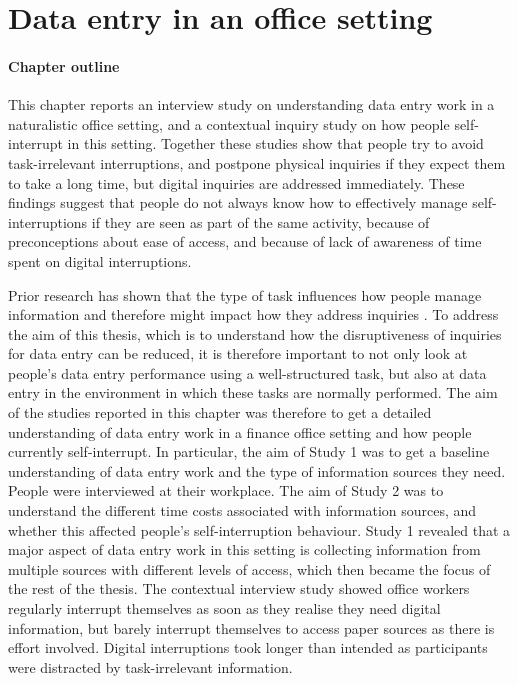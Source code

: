\chapter{Data entry in an office setting}\label{ch:Study1}
\begin{mynote}
\subsubsection{Chapter outline}

This chapter reports an interview study on understanding data entry work in a naturalistic office setting, and a contextual inquiry study on how people self-interrupt in this setting. Together these studies show that people try to avoid task-irrelevant interruptions, and postpone physical inquiries if they expect them to take a long time, but digital inquiries are addressed immediately. These findings suggest that people do not always know how to effectively manage self-interruptions if they are seen as part of the same activity, because of preconceptions about ease of access, and because of lack of awareness of time spent on digital interruptions.

\end{mynote}
Prior research has shown that the type of task influences how people manage information and therefore might impact how they address inquiries \citep{Bondarenko2005}. To address the aim of this thesis, which is to understand how the disruptiveness of inquiries for data entry can be reduced, it is therefore important to not only look at people's data entry performance using a well-structured task, but also at data entry in the environment in which these tasks are normally performed. The aim of the studies reported in this chapter was therefore to get a detailed understanding of data entry work in a finance office setting and how people currently self-interrupt. In particular, the aim of Study 1 was to get a baseline understanding of data entry work and the type of information sources they need. People were interviewed at their workplace. The aim of Study 2 was to understand the different time costs associated with information sources, and whether this affected people's self-interruption behaviour. Study 1 revealed that a major aspect of data entry work in this setting is collecting information from multiple sources with different levels of access, which then became the focus of the rest of the thesis. The contextual interview study showed office workers regularly interrupt themselves as soon as they realise they need digital information, but barely interrupt themselves to access paper sources as there is effort involved. Digital interruptions took longer than intended as participants were distracted by task-irrelevant information.

